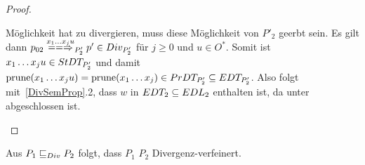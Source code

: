 \begin{proof}
\begin{itemize}
\begin{itemize}
          Möglichkeit hat zu divergieren, muss diese Möglichkeit von $P'_2$
          geerbt sein. Es gilt dann $p_{02} \lweakmay[x_1\dots x_j u]_{P'_2} p'
          \in Div _{P'_2}$ für $j\geq 0$ und $u\in O^*$. Somit ist $x_1\dots
          x_j u\in StDT _{P'_2}$ und damit $\mathrm{prune} (x_1\dots x_j u) = \mathrm{prune}
          (x_1\dots x_j)\in PrDT _{P'_2}\subseteq EDT _{P'_2}$. Also folgt
          mit~\ref{DivSemProp}.2, dass $w$ in $EDT _2 \subseteq EDL _2$
          enthalten ist, da \DT{} unter \cont{} abgeschlossen ist.
      \end{itemize}
  \end{itemize}
\end{proof}

\begin{Satz}
  \label{DivTestVerfSatz}
  Aus $P_1  \sqsubseteq  _{Div} P_2$ folgt, dass $P_1$ $P_2$ Divergenz-verfeinert.
\end{Satz}
